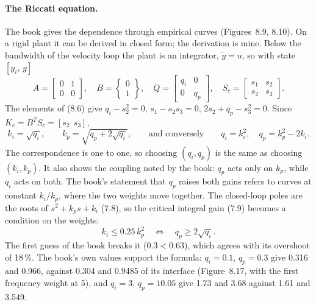 \documentclass[10pt,a4paper]{article}
\numberwithin{equation}{section}
\begin{document}
\paragraph{The Riccati equation.} The book gives the dependence through empirical curves (Figures~8.9, 8.10). On a rigid plant it can be derived in closed form; the derivation is mine. Below the bandwidth of the velocity loop the plant is an integrator, $\dot y=u$, so with state $[y_i,\,y]$
\begin{equation}
A=\begin{bmatrix}0&1\\0&0\end{bmatrix},\quad B=\begin{Bmatrix}0\\1\end{Bmatrix},\quad Q=\begin{bmatrix}q_i&0\\0&q_p\end{bmatrix},\quad S_c=\begin{bmatrix}s_1&s_2\\s_2&s_3\end{bmatrix}.
\end{equation}
The elements of (8.6) give $q_i-s_2^2=0$, $s_1-s_2s_3=0$, $2s_2+q_p-s_3^2=0$. Since $K_c=B^TS_c=[s_2\ \ s_3]$,
\begin{equation}
k_i=\sqrt{q_i},\qquad k_p=\sqrt{q_p+2\sqrt{q_i}},\qquad\text{and conversely}\qquad q_i=k_i^2,\quad q_p=k_p^2-2k_i .
\end{equation}
The correspondence is one to one, so choosing $(q_i,q_p)$ is the same as choosing $(k_i,k_p)$. It also shows the coupling noted by the book: $q_p$ acts only on $k_p$, while $q_i$ acts on both. The book's statement that $q_p$ raises both gains refers to curves at constant $k_i/k_p$, where the two weights move together. The closed-loop poles are the roots of $s^2+k_ps+k_i$ (7.8), so the critical integral gain (7.9) becomes a condition on the weights:
\begin{equation}
k_i\leq0.25\,k_p^2\quad\Longleftrightarrow\quad q_p\geq2\sqrt{q_i}.
\end{equation}
The first guess of the book breaks it ($0.3<0.63$), which agrees with its overshoot of 18\,\%. The book's own values support the formula: $q_i=0.1$, $q_p=0.3$ give 0.316 and 0.966, against 0.304 and 0.9485 of its interface (Figure~8.17, with the first frequency weight at 5), and $q_i=3$, $q_p=10.05$ give 1.73 and 3.68 against 1.61 and 3.549.
\end{document}
